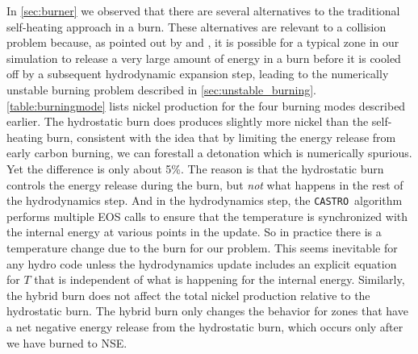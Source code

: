 \documentclass[twocolumn,numberedappendix]{../aastex6}
\newcommand{\castro}{\texttt{CASTRO}}
\begin{document}
In \autoref{sec:burner} we observed that there are several alternatives to the traditional
self-heating approach in a burn. These alternatives are relevant to a collision problem because,
as pointed out by \cite{raskin:2010} and \cite{kushnir:2013}, it is possible for a typical
zone in our simulation to release a very large amount of energy in a burn before it is cooled
off by a subsequent hydrodynamic expansion step, leading to the numerically unstable burning
problem described in \autoref{sec:unstable_burning}. \autoref{table:burningmode} lists nickel
production for the four burning modes described earlier. The hydrostatic burn does produces
slightly more nickel than the self-heating burn, consistent with the idea that by limiting the
energy release from early carbon burning, we can forestall a detonation which is numerically
spurious. Yet the difference is only about 5\%. The reason is that the hydrostatic burn controls
the energy release during the burn, but \textit{not} what happens in the rest of the hydrodynamics
step. And in the hydrodynamics step, the \castro\ algorithm performs multiple EOS calls to ensure
that the temperature is synchronized with the internal energy at various points in the update.
So in practice there is a temperature change due to the burn for our problem. This seems inevitable
for any hydro code unless the hydrodynamics update includes an explicit equation for $T$ that is
independent of what is happening for the internal energy. Similarly, the hybrid burn does not
affect the total nickel production relative to the hydrostatic burn. The hybrid burn only changes
the behavior for zones that have a net negative energy release from the hydrostatic burn, which
occurs only after we have burned to NSE.


\end{document}

